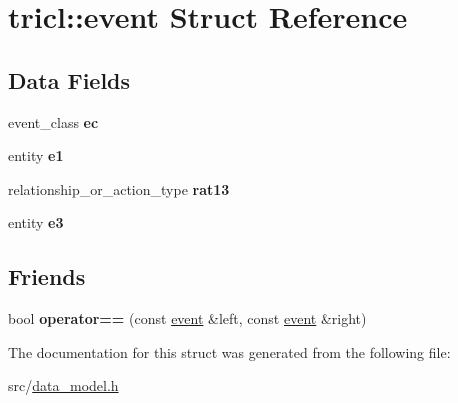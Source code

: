 \hypertarget{structtricl_1_1event}{}\section{tricl\+:\+:event Struct Reference}
\label{structtricl_1_1event}
\subsection*{Data Fields}
\begin{DoxyCompactItemize}
\item 
\mbox{\label{structtricl_1_1event_ab77115c2d4aada8d5c4f51dd6abcaa2a}} 
event\+\_\+class {\bfseries ec}
\item 
\mbox{\label{structtricl_1_1event_ae3de57643cd0d42762c1fcbd86bd2632}} 
entity {\bfseries e1}
\item 
\mbox{\label{structtricl_1_1event_a57d8ec5cf582b4cd2de127590d805325}} 
relationship\+\_\+or\+\_\+action\+\_\+type {\bfseries rat13}
\item 
\mbox{\label{structtricl_1_1event_a49b653bfd4b01a1b561849e8aeadb53d}} 
entity {\bfseries e3}
\end{DoxyCompactItemize}
\subsection*{Friends}
\begin{DoxyCompactItemize}
\item 
\mbox{\label{structtricl_1_1event_a3dd0c9c41d63a2d2171cffc7dfa14d6c}} 
bool {\bfseries operator==} (const \hyperlink{structtricl_1_1event}{event} \&left, const \hyperlink{structtricl_1_1event}{event} \&right)
\end{DoxyCompactItemize}


The documentation for this struct was generated from the following file\+:\begin{DoxyCompactItemize}
\item 
src/\hyperlink{data__model_8h}{data\+\_\+model.\+h}\end{DoxyCompactItemize}
